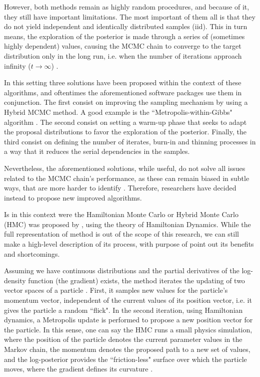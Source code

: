 However, both methods remain as highly random procedures, and because of it, they still have important limitations. The most important of them all is that they do not yield independent and identically distributed samples (iid). This in turn means, the exploration of the posterior is made through a series of (sometimes highly dependent) values, causing the MCMC chain to converge to the target distribution only in the long run, i.e. when the number of iterations approach infinity ($t \rightarrow \infty$) \cite{Gelman_et_al_2014}. 

In this setting three solutions have been proposed within the context of these algorithms, and oftentimes the aforementioned software packages use them in conjunction. The first consist on improving the sampling mechanism by using a Hybrid MCMC method. A good example is the ``Metropolis-within-Gibbs" algorithm \cite{Muller_1991}. The second consist on setting a warm-up phase that seeks to adapt the proposal distributions to favor the exploration of the posterior. Finally, the third consist on defining the number of iterates, burn-in and thinning processes in a way that it reduces the serial dependencies in the samples. 

Nevertheless, the aforementioned solutions, while useful, do not solve all issues related to the MCMC chain's performance, as these can remain biased in subtle ways, that are more harder to identify \cite{McElreath_2020}. Therefore, researchers have decided instead to propose new improved algorithms. 

Is in this context were the Hamiltonian Monte Carlo or Hybrid Monte Carlo (HMC) was proposed by \citet{Duane_et_al_1987}, using the theory of Hamiltonian Dynamics. While the full representation of method is out of the scope of this research, we can still make a high-level description of its process, with purpose of point out its benefits and shortcomings. 

Assuming we have continuous distributions and the partial derivatives of the log-density function (the gradient) exists, the method iterates the updating of two vector spaces of a particle \cite{Neal_2011, McElreath_2020}. First, it samples new values for the particle's momentum vector, independent of the current values of its position vector, i.e. it gives the particle a random ``flick". In the second iteration, using Hamiltonian dynamics, a Metropolis update is performed to propose a new position vector for the particle. In this sense, one can say the HMC runs a small physics simulation, where the position of the particle denotes the current parameter values in the Markov chain, the momentum denotes the proposed path to a new set of values, and the log-posterior provides the ``friction-less" surface over which the particle moves, where the gradient defines its curvature \cite{McElreath_2020}.

